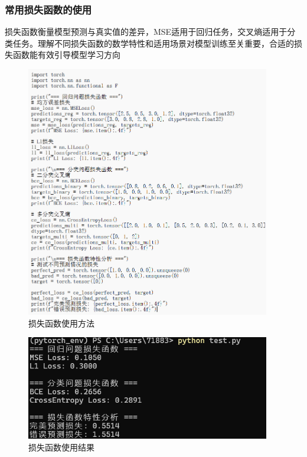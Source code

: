 \documentclass[UTF8]{ctexart}
\begin{document}
\subsubsection{常用损失函数的使用}
损失函数衡量模型预测与真实值的差异，MSE适用于回归任务，交叉熵适用于分类任务。理解不同损失函数的数学特性和适用场景对模型训练至关重要，合适的损失函数能有效引导模型学习方向
\begin{figure}[H]
    \centering
    \includegraphics[width=0.95\textwidth]{picture/损失函数的使用.png}%
    \caption{损失函数使用方法}
\end{figure}

\begin{figure}[H]
    \centering
    \includegraphics[width=0.95\textwidth]{picture/损失函数使用结果.png}%
    \caption{损失函数使用结果}
\end{figure}
\end{document}

